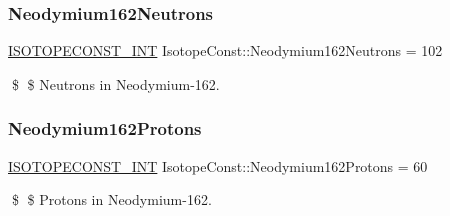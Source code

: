 \subsubsection{\texorpdfstring{Neodymium162\+Neutrons}{Neodymium162Neutrons}}
{\footnotesize\ttfamily \mbox{\hyperlink{group___isotope_const-_macros_ga5f18360b3e99483a35c32d789e62621c}{I\+S\+O\+T\+O\+P\+E\+C\+O\+N\+S\+T\+\_\+\+I\+NT}} Isotope\+Const\+::\+Neodymium162\+Neutrons = 102}

\$ \$ Neutrons in Neodymium-\/162. \mbox{\label{group___isotope_const-_neodymium-_nd162_ga7295e8bb8ac6fa58e2876e30a73c8010}} 
\subsubsection{\texorpdfstring{Neodymium162\+Protons}{Neodymium162Protons}}
{\footnotesize\ttfamily \mbox{\hyperlink{group___isotope_const-_macros_ga5f18360b3e99483a35c32d789e62621c}{I\+S\+O\+T\+O\+P\+E\+C\+O\+N\+S\+T\+\_\+\+I\+NT}} Isotope\+Const\+::\+Neodymium162\+Protons = 60}

\$ \$ Protons in Neodymium-\/162. 